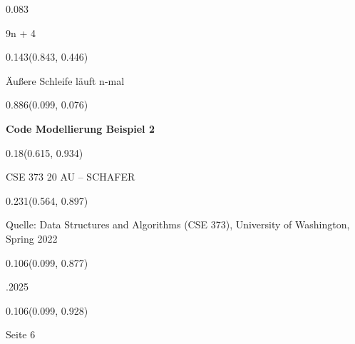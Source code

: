 \documentclass[aspectratio=169]{beamer}
\begin{document}
\begin{frame}[fragile]
\begin{textblock}{0.083}
\begin{minipage}[t][0.044\paperheight]{\linewidth}
    {\tiny 9n + 4}
  \end{minipage}
\end{textblock}
\begin{textblock}{0.143}(0.843, 0.446)
  \begin{minipage}[t][0.094\paperheight]{\linewidth}
    {\small Äußere Schleife läuft n-mal}
  \end{minipage}
\end{textblock}
\begin{textblock}{0.886}(0.099, 0.076)
  \begin{minipage}[t][0.131\paperheight]{\linewidth}
    \textbf{Code Modellierung Beispiel 2}
  \end{minipage}
\end{textblock}
\begin{textblock}{0.18}(0.615, 0.934)
  \begin{minipage}[b][0.032\paperheight]{\linewidth}
    \raggedright
    \fontsize{3}{3.3}\selectfont
    CSE 373 20 AU – SCHAFER
  \end{minipage}
\end{textblock}
\begin{textblock}{0.231}(0.564, 0.897)
  \begin{minipage}[b][0.032\paperheight]{\linewidth}
    \raggedright
    \fontsize{3}{3.3}\selectfont
    Quelle: Data Structures and Algorithms (CSE 373), University of Washington, Spring 2022
  \end{minipage}
\end{textblock}
\begin{textblock}{0.106}(0.099, 0.877)
  \begin{minipage}[b][0.026\paperheight]{\linewidth}
    \raggedright
    \fontsize{3}{3.3}.2025
  \end{minipage}
\end{textblock}
\begin{textblock}{0.106}(0.099, 0.928)
  \begin{minipage}[b][0.031\paperheight]{\linewidth}
    \raggedright
    \fontsize{3}{3.3}\selectfont
    Seite 6
  \end{minipage}
\end{textblock}
\end{frame}
\end{document}
